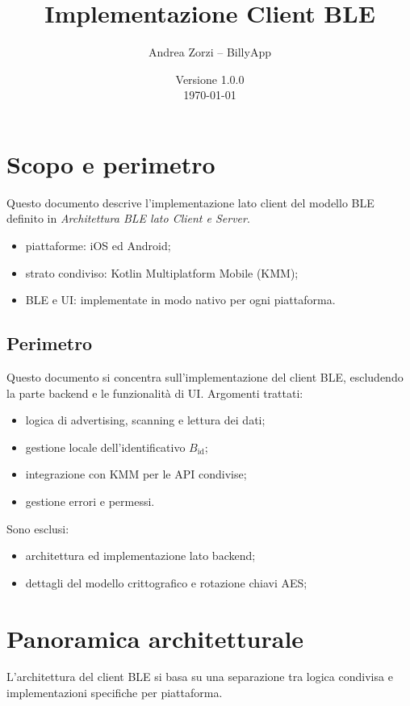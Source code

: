 \documentclass[a4paper,11pt,table,dvipsnames]{article}
\title{Implementazione Client BLE}
\author{Andrea Zorzi -- BillyApp}
\date{Versione 1.0.0 \\ \today}
\begin{document}
\maketitle

\tableofcontents

\newpage

\section{Scopo e perimetro}

Questo documento descrive l'implementazione lato client del modello BLE definito in \emph{Architettura BLE lato Client e Server}.

\begin{itemize}
    \item piattaforme: iOS ed Android;
    \item strato condiviso: Kotlin Multiplatform Mobile (KMM);
    \item BLE e UI: implementate in modo nativo per ogni piattaforma.
\end{itemize}

\subsection{Perimetro}
Questo documento si concentra sull'implementazione del client BLE, escludendo la parte backend e le funzionalità di UI.
Argomenti trattati:
\begin{itemize}
    \item logica di advertising, scanning e lettura dei dati;
    \item gestione locale dell'identificativo \(B_{\text{id}}\);
    \item integrazione con KMM per le API condivise;
    \item gestione errori e permessi.
\end{itemize}

Sono esclusi:
\begin{itemize}
    \item architettura ed implementazione lato backend;
    \item dettagli del modello crittografico e rotazione chiavi AES;
\end{itemize}

\section{Panoramica architetturale}
L'architettura del client BLE si basa su una separazione tra logica condivisa e implementazioni specifiche per piattaforma.
\end{document}
